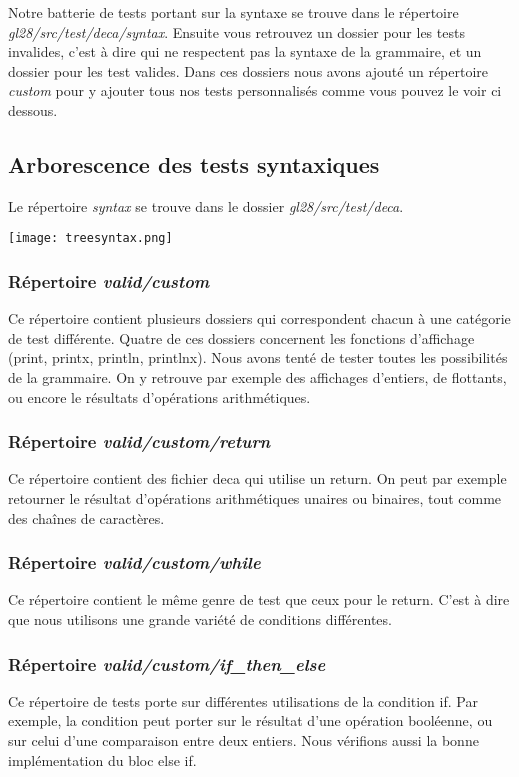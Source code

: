 \documentclass[12pt, a4paper, one side]{article}
\begin{document}
Notre batterie de tests portant sur la syntaxe se trouve dans le répertoire \textit{gl28/src/test/deca/syntax}. Ensuite vous retrouvez un dossier pour les tests invalides, c'est à dire qui ne respectent pas la syntaxe de la grammaire, et un dossier pour les test valides. Dans ces dossiers nous avons ajouté un répertoire \textit{custom} pour y ajouter tous nos tests personnalisés comme vous pouvez le voir ci dessous.

\subsection{Arborescence des tests syntaxiques}
Le répertoire \textit{syntax} se trouve dans le dossier \textit{gl28/src/test/deca}.
\begin{center} 
    \texttt{[image: treesyntax.png]} 
\end{center}

\subsubsection{Répertoire \textit{valid/custom}}
Ce répertoire contient plusieurs dossiers qui correspondent chacun à une catégorie de test différente. Quatre de ces dossiers concernent les fonctions d'affichage (print, printx, println, printlnx). Nous avons tenté de tester toutes les possibilités de la grammaire. On y retrouve par exemple des affichages d'entiers, de flottants, ou encore le résultats d'opérations arithmétiques.

\subsubsection{Répertoire \textit{valid/custom/return}}
Ce répertoire contient des fichier deca qui utilise un return. On peut par exemple retourner le résultat d'opérations arithmétiques unaires ou binaires, tout comme des chaînes de caractères.

\subsubsection{Répertoire \textit{valid/custom/while}}
Ce répertoire contient le même genre de test que ceux pour le return. C'est à dire que nous utilisons une grande variété de conditions différentes.

\subsubsection{Répertoire \textit{valid/custom/if\_then\_else}}
Ce répertoire de tests porte sur différentes utilisations de la condition if. Par exemple, la condition peut porter sur le résultat d'une opération booléenne, ou sur celui d'une comparaison entre deux entiers. Nous vérifions aussi la bonne implémentation du bloc else if.
\end{document}
